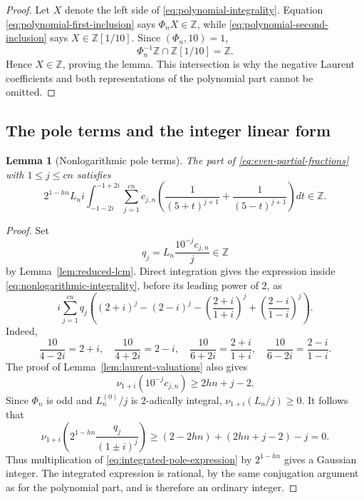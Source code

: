 \documentclass[11pt,reqno,letterpaper]{amsart}
\numberwithin{equation}{section}
\newtheorem{lemma}[theorem]{Lemma}
\theoremstyle{definition}
\theoremstyle{remark}
\begin{document}
\begin{proof}
Let $X$ denote the left side of \eqref{eq:polynomial-integrality}.
Equation \eqref{eq:polynomial-first-inclusion} says $\Phi_nX\in\mathbb Z$,
while \eqref{eq:polynomial-second-inclusion} says
$X\in\mathbb Z[1/10]$.  Since $(\Phi_n,10)=1$,
\begin{equation}\label{eq:intersection-argument}
 \Phi_n^{-1}\mathbb Z\cap\mathbb Z[1/10]=\mathbb Z.
\end{equation}
Hence $X\in\mathbb Z$, proving the lemma.  This intersection is why the
negative Laurent coefficients and both representations of the polynomial
part cannot be omitted.
\end{proof}

\subsection{The pole terms and the integer linear form}

\begin{lemma}[Nonlogarithmic pole terms]\label{lem:nonlogarithmic-poles}
The part of \eqref{eq:even-partial-fractions} with $1\leq j\leq cn$
satisfies
\begin{equation}\label{eq:nonlogarithmic-integrality}
 2^{1-hn}L_n i\int_{-1-2i}^{-1+2i}
 \sum_{j=1}^{cn}c_{j,n}
 \left(\frac1{(5+t)^{j+1}}+\frac1{(5-t)^{j+1}}\right)dt
 \in\mathbb Z.
\end{equation}
\end{lemma}

\begin{proof}
Set
\[
 q_j=L_n\frac{10^{-j}c_{j,n}}j\in\mathbb Z
\]
by Lemma~\ref{lem:reduced-lcm}.  Direct integration gives the expression
inside \eqref{eq:nonlogarithmic-integrality}, before its leading power of
$2$, as
\begin{equation}\label{eq:integrated-pole-expression}
 i\sum_{j=1}^{cn}q_j\left(
 (2+i)^j-(2-i)^j
 -\left(\frac{2+i}{1+i}\right)^j
 +\left(\frac{2-i}{1-i}\right)^j\right).
\end{equation}
Indeed,
\[
 \frac{10}{4-2i}=2+i,
 \quad \frac{10}{4+2i}=2-i,
 \quad \frac{10}{6+2i}=\frac{2+i}{1+i},
 \quad \frac{10}{6-2i}=\frac{2-i}{1-i}.
\]
The proof of Lemma~\ref{lem:laurent-valuations} also gives
\[
 \nu_{1+i}(10^{-j}c_{j,n})\geq2hn+j-2.
\]
Since $\Phi_n$ is odd and $L_n^{(0)}/j$ is $2$-adically integral,
$\nu_{1+i}(L_n/j)\geq0$.  It follows that
\[
 \nu_{1+i}\left(
 2^{1-hn}\frac{q_j}{(1\pm i)^j}\right)\geq
 (2-2hn)+(2hn+j-2)-j=0.
\]
Thus multiplication of \eqref{eq:integrated-pole-expression} by
$2^{1-hn}$ gives a Gaussian integer.  The integrated expression is
rational, by the same conjugation argument as for the polynomial part,
and is therefore an ordinary integer.
\end{proof}
\end{document}
